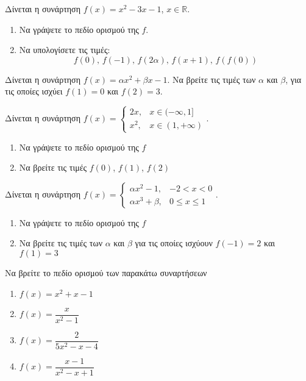 \documentclass{../../presentation}
\begin{document}
\begin{askisi}
  Δίνεται η συνάρτηση $f(x)=x^2-3x-1$, $x\in\mathbb{R}$.
  \begin{enumerate}[<+->]
    \item Να γράψετε το πεδίο ορισμού της $f$.
    \item Να υπολογίσετε τις τιμές:
          $$f(0) \text{, } f(-1) \text{, }f(2α) \text{, }f(x+1) \text{, }f\left(f(0)\right) $$
  \end{enumerate}
\end{askisi}

\begin{askisi}
  Δίνεται η συνάρτηση $f(x)=αx^2+βx-1$. Να βρείτε τις τιμές των $α$ και $β$, για τις οποίες ισχύει $f(1)=0$ και $f(2)=3$.
\end{askisi}

\begin{askisi}
  Δίνεται η συνάρτηση $f(x)=
    \begin{cases}
      2x,  & x\in(-\infty,1] \\
      x^2, & x\in(1,+\infty)
    \end{cases}$.
  \begin{enumerate}[<+->]
    \item Να γράψετε το πεδίο ορισμού της $f$
    \item Να βρείτε τις τιμές $f(0)$, $f(1)$, $f(2)$
  \end{enumerate}
\end{askisi}

\begin{askisi}
  Δίνεται η συνάρτηση $f(x)=
    \begin{cases}
      αx^2-1, & -2<x<0      \\
      αx^3+β, & 0\le x\le 1
    \end{cases}$.
  \begin{enumerate}[<+->]
    \item Να γράψετε το πεδίο ορισμού της $f$
    \item Να βρείτε τις τιμές των $α$ και $β$ για τις οποίες ισχύουν $f(-1)=2$ και $f(1)=3$
  \end{enumerate}
\end{askisi}

\begin{askisi}
  Να βρείτε το πεδίο ορισμού των παρακάτω συναρτήσεων
  \begin{enumerate}[<+->]
    \item $f(x)=x^2+x-1$
    \item $f(x)=\dfrac{x}{x^2-1}$
    \item $f(x)=\dfrac{2}{5x^2-x-4}$
    \item $f(x)=\dfrac{x-1}{x^2-x+1}$
  \end{enumerate}
\end{askisi}
\end{document}
